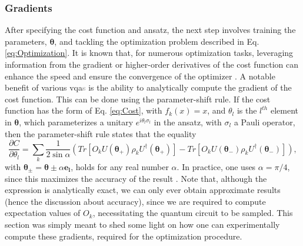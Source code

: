\subsubsection*{\small Gradients}
After specifying the cost function and ansatz, the next step involves training the parameters, $\boldsymbol{\theta}$, and tackling the optimization problem described in Eq. \ref{eq:Optimization}. It is known that, for numerous optimization tasks, leveraging information from the gradient or higher-order derivatives of the cost function can enhance the speed and ensure the convergence of the optimizer \cite{Cerezo_2021}. A notable benefit of various \acrshort{vqa}\textcolor{gray}{s} is the ability to analytically compute the gradient of the cost function. This can be done using the parameter-shift rule. If the cost function has the form of Eq. \ref{eq:Cost}, with $f_k(x) = x$, and $\theta_l$ is the $l^{th}$ element in $\boldsymbol{\theta}$, which parameterizes a unitary $e^{i\theta_l \sigma_l}$ in the ansatz, with $\sigma_l$ a Pauli operator, then the parameter-shift rule states that the equality
\begin{equation}
    \frac{\partial C}{\partial \theta_l} = \sum_k \frac{1}{2\sin{\alpha}}\left(Tr\left[O_k U(\boldsymbol{\theta_+}) \rho_k U^{\dagger}(\boldsymbol{\theta_+})\right] - Tr\left[O_k U(\boldsymbol{\theta_-}) \rho_k U^{\dagger}(\boldsymbol{\theta_-})\right]\right),
\end{equation}
with $\boldsymbol{\theta_{\pm}} = \boldsymbol{\theta} \pm \alpha \boldsymbol{e_l}$, holds for any real number $\alpha$. In practice, one uses $\alpha = \pi/4$, since this maximizes the accuracy of the result \cite{Cerezo_2021}. Note that, although the expression is analytically exact, we can only ever obtain approximate results (hence the discussion about accuracy), since we are required to compute expectation values of $O_k$, necessitating the quantum circuit to be sampled. This section was simply meant to shed some light on how one can experimentally compute these gradients, required for the optimization procedure.


